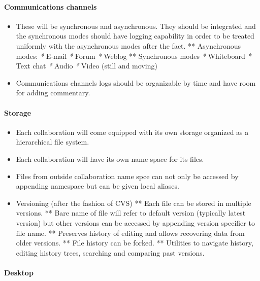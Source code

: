 \paragraph{Communications channels}

\begin{itemize}
\item
  These will be synchronous and asynchronous. They should be integrated
  and the synchronous modes should have logging capability in order to
  be treated uniformly with the asynchronous modes after the fact. **
  Asynchronous modes: \emph{*} E-mail \emph{*} Forum \emph{*} Weblog **
  Synchronous modes \emph{*} Whiteboard \emph{*} Text chat \emph{*}
  Audio \emph{*} Video (still and moving)
\item
  Communications channels logs should be organizable by time and have
  room for adding commentary.
\end{itemize}

\paragraph{Storage}

\begin{itemize}
\item
  Each collaboration will come equipped with its own storage organized
  as a hierarchical file system.
\item
  Each collaboration will have its own name space for its files.
\item
  Files from outside collaboration name spce can not only be accessed by
  appending namespace but can be given local aliases.
\item
  Versioning (after the fashion of CVS) ** Each file can be stored in
  multiple versions. ** Bare name of file will refer to default version
  (typically latest version) but other versions can be accessed by
  appending version specifier to file name. ** Preserves history of
  editing and allows recovering data from older versions. ** File
  history can be forked. ** Utilities to navigate history, editing
  history trees, searching and comparing past versions.
\end{itemize}

\paragraph{Desktop}

